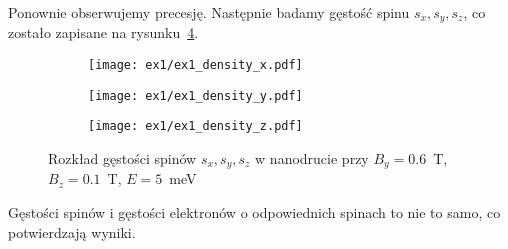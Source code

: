 \documentclass{article}
\begin{document}
Ponownie obserwujemy precesję.
Następnie badamy gęstość spinu $s_x, s_y, s_z$, co zostało zapisane na rysunku~\ref{fig:ex1-spin-density-s}.
\begin{figure}[htp!]
    \centering
\begin{subfigure}{.495\textwidth}
    \texttt{[image: ex1/ex1\_density\_x.pdf]}
    \caption{}
    \label{fig?:ex1-sx}
\end{subfigure}
\begin{subfigure}{.495\textwidth}
    \texttt{[image: ex1/ex1\_density\_y.pdf]}
    \caption{}
    \label{fig:ex1-sy}
\end{subfigure}
\begin{subfigure}{.495\textwidth}
    \texttt{[image: ex1/ex1\_density\_z.pdf]}
    \caption{}
    \label{fig:ex1-sz}
\end{subfigure}
\caption{Rozkład gęstości spinów $s_x, s_y, s_z$ w nanodrucie przy $B_y = 0.6$~T, $B_z = 0.1$~T, $E = 5$~meV}
\label{fig:ex1-spin-density-s}
\end{figure}
Gęstości spinów i gęstości elektronów o odpowiednich spinach to nie to samo, co potwierdzają wyniki.
\end{document}
